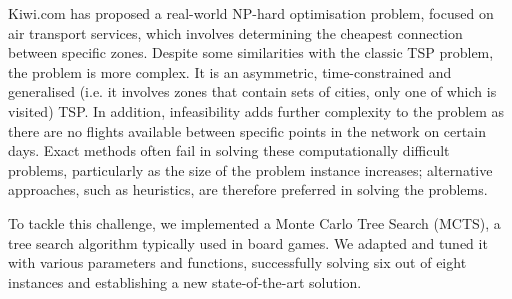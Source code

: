 

Kiwi.com has proposed a real-world NP-hard optimisation problem, focused on air transport services, which involves determining the cheapest connection between specific zones. Despite some similarities with the classic TSP problem, the problem is more complex. It is an asymmetric, time-constrained and generalised (i.e. it involves zones that contain sets of cities, only one of which is visited) TSP. In addition, infeasibility adds further complexity to the problem as there are no flights available between specific points in the network on certain days. Exact methods often fail in solving these computationally difficult problems, particularly as the size of the problem instance increases; alternative approaches, such as heuristics, are therefore preferred in solving the problems.

To tackle this challenge, we implemented a Monte Carlo Tree Search (MCTS), a tree search algorithm typically used in board games. We adapted and tuned it with various parameters and functions, successfully solving six out of eight instances and establishing a new state-of-the-art solution.

\clearpage

